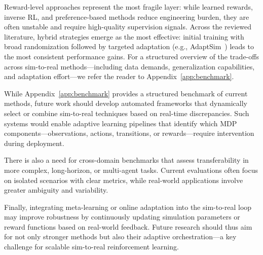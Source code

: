 Reward-level approaches represent the most fragile layer: while learned rewards, inverse RL, and preference-based methods reduce engineering burden, they are often unstable and require high-quality supervision signals. Across the reviewed literature, hybrid strategies emerge as the most effective: initial training with broad randomization followed by targeted adaptation (e.g., AdaptSim~\cite{Ren2023}) leads to the most consistent performance gains. For a structured overview of the trade-offs across sim-to-real methods—including data demands, generalization capabilities, and adaptation effort—we refer the reader to Appendix~\ref{app:benchmark}.

While Appendix~\ref{app:benchmark} provides a structured benchmark of current methods, future work should develop automated frameworks that dynamically select or combine sim-to-real techniques based on real-time discrepancies. Such systems would enable adaptive learning pipelines that identify which MDP components—observations, actions, transitions, or rewards—require intervention during deployment.

There is also a need for cross-domain benchmarks that assess transferability in more complex, long-horizon, or multi-agent tasks. Current evaluations often focus on isolated scenarios with clear metrics, while real-world applications involve greater ambiguity and variability.

Finally, integrating meta-learning or online adaptation into the sim-to-real loop may improve robustness by continuously updating simulation parameters or reward functions based on real-world feedback. Future research should thus aim for not only stronger methods but also their adaptive orchestration—a key challenge for scalable sim-to-real reinforcement learning.